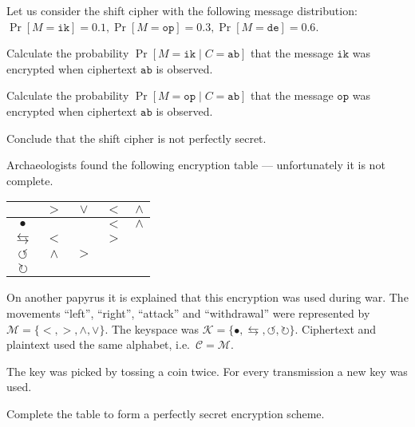 \documentclass[a4paper,10pt,landscape,twocolumn]{scrartcl}
\begin{document}
\begin{exercise}
Let us consider the shift cipher with the following message distribution: $\Pr[M = \mathtt{ik}]=0.1, \Pr[M = \mathtt{op}]=0.3, \Pr[M = \mathtt{de}]=0.6$.
\begin{subex}
Calculate the probability $\Pr[M=\mathtt{ik} \mid C=\mathtt{ab}]$ that the message $\mathtt{ik}$ was encrypted when
 ciphertext $\mathtt{ab}$ is observed.
\end{subex}
\begin{subex}
Calculate the probability $\Pr[M=\mathtt{op} \mid C=\mathtt{ab}]$ that the message $\mathtt{op}$ was encrypted when
 ciphertext $\mathtt{ab}$ is observed.
\end{subex}
\begin{subex}
Conclude that the shift cipher is not perfectly secret.
\end{subex}
\end{exercise}


\begin{exercise}
Archaeologists found the following encryption table --- unfortunately it is not complete.
  \begin{center}
    \begin{tabular}{c||c|c|c|c}
      & $>$ & $\vee$ & $<$ & $\wedge$ \\
      \hline
      \hline
      $\bullet$ &  &  & $<$ & $\wedge$ \\
      \hline
      $\leftrightarrows$ & $<$ &  & $>$ &  \\
      \hline
      $\circlearrowleft$ & $\wedge$ & $>$ &  & \\
      \hline
      $\circlearrowright$ &  &  &  &  \\
    \end{tabular}
  \end{center}
  On another papyrus it is explained that this encryption was used during war.
  The movements ``left'', ``right'', ``attack'' and ``withdrawal'' were represented by $\mathcal{M} = \{<,>,\wedge,\vee\}$.
  The keyspace was $\mathcal{K} = \{\bullet,\leftrightarrows,\circlearrowleft, \circlearrowright\}$.
  Ciphertext and plaintext used the same alphabet, i.e.~$\mathcal{C} = \mathcal{M}$.

  The key was picked by tossing a coin twice.
  For every transmission a new key was used.

Complete the table to form a perfectly secret encryption scheme.
\end{exercise}
\end{document}
